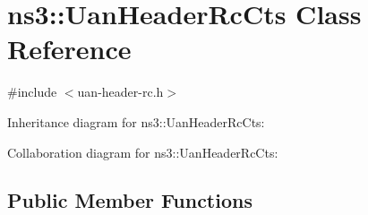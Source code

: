 \hypertarget{classns3_1_1UanHeaderRcCts}{}\section{ns3\+:\+:Uan\+Header\+Rc\+Cts Class Reference}
\label{classns3_1_1UanHeaderRcCts}


{\ttfamily \#include $<$uan-\/header-\/rc.\+h$>$}



Inheritance diagram for ns3\+:\+:Uan\+Header\+Rc\+Cts\+:


Collaboration diagram for ns3\+:\+:Uan\+Header\+Rc\+Cts\+:
\subsection*{Public Member Functions}
